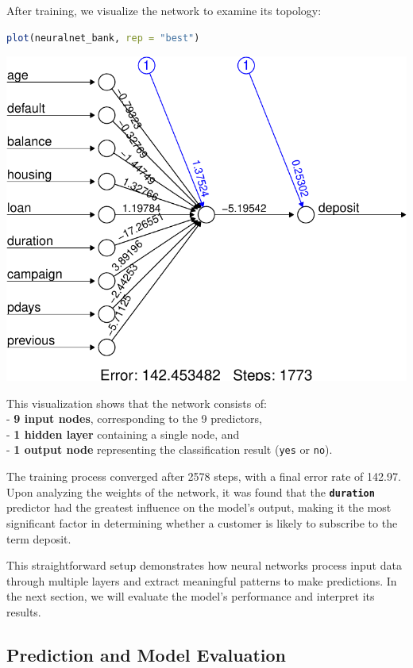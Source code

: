 \documentclass[
]{book}
\newcommand{\passthrough}[1]{#1}
\theoremstyle{definition}
\theoremstyle{definition}
\theoremstyle{definition}
\theoremstyle{definition}
\theoremstyle{remark}
\begin{document}
After training, we visualize the network to examine its topology:

\begin{lstlisting}[language=R]
plot(neuralnet_bank, rep = "best")
\end{lstlisting}

\begin{center}\includegraphics[width=0.7\linewidth]{nn_files/figure-latex/unnamed-chunk-11-1} \end{center}

This visualization shows that the network consists of:\\
- \textbf{9 input nodes}, corresponding to the 9 predictors,\\
- \textbf{1 hidden layer} containing a single node, and\\
- \textbf{1 output node} representing the classification result (\passthrough{\lstinline!yes!} or \passthrough{\lstinline!no!}).

The training process converged after 2578 steps, with a final error rate of 142.97. Upon analyzing the weights of the network, it was found that the \textbf{\passthrough{\lstinline!duration!}} predictor had the greatest influence on the model's output, making it the most significant factor in determining whether a customer is likely to subscribe to the term deposit.

This straightforward setup demonstrates how neural networks process input data through multiple layers and extract meaningful patterns to make predictions. In the next section, we will evaluate the model's performance and interpret its results.

\subsection*{Prediction and Model Evaluation}\label{prediction-and-model-evaluation-2}
\end{document}
